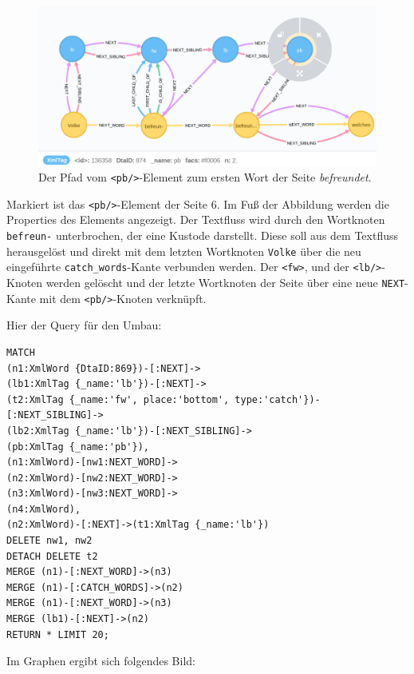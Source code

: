 \documentclass[12pt,ngerman,]{article}
\begin{document}
\begin{figure}
\centering
\includegraphics{Bilder/TEI2Graph/pb6-Bestand.png}
\caption{Der Pfad vom \texttt{\textless{}pb/\textgreater{}}-Element zum
ersten Wort der Seite \emph{befreundet}.}
\end{figure}

Markiert ist das \texttt{\textless{}pb/\textgreater{}}-Element der Seite
6. Im Fuß der Abbildung werden die Properties des Elements angezeigt.
Der Textfluss wird durch den Wortknoten \texttt{befreun-} unterbrochen,
der eine Kustode darstellt. Diese soll aus dem Textfluss herausgelöst
und direkt mit dem letzten Wortknoten \texttt{Volke} über die neu
eingeführte \texttt{catch\_words}-Kante verbunden werden. Der
\texttt{\textless{}fw\textgreater{}}, und der
\texttt{\textless{}lb/\textgreater{}}-Knoten werden gelöscht und der
letzte Wortknoten der Seite über eine neue \texttt{NEXT}-Kante mit dem
\texttt{\textless{}pb/\textgreater{}}-Knoten verknüpft.

Hier der Query für den Umbau:

\begin{verbatim}
MATCH
(n1:XmlWord {DtaID:869})-[:NEXT]->
(lb1:XmlTag {_name:'lb'})-[:NEXT]->
(t2:XmlTag {_name:'fw', place:'bottom', type:'catch'})-[:NEXT_SIBLING]->
(lb2:XmlTag {_name:'lb'})-[:NEXT_SIBLING]->
(pb:XmlTag {_name:'pb'}),
(n1:XmlWord)-[nw1:NEXT_WORD]->
(n2:XmlWord)-[nw2:NEXT_WORD]->
(n3:XmlWord)-[nw3:NEXT_WORD]->
(n4:XmlWord),
(n2:XmlWord)-[:NEXT]->(t1:XmlTag {_name:'lb'})
DELETE nw1, nw2
DETACH DELETE t2
MERGE (n1)-[:NEXT_WORD]->(n3)
MERGE (n1)-[:CATCH_WORDS]->(n2)
MERGE (n1)-[:NEXT_WORD]->(n3)
MERGE (lb1)-[:NEXT]->(n2)
RETURN * LIMIT 20;
\end{verbatim}

Im Graphen ergibt sich folgendes Bild:
\end{document}
